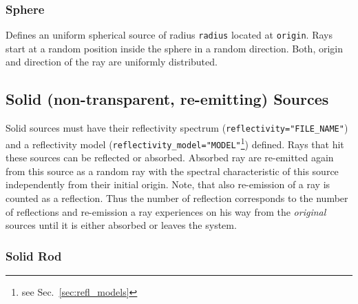 \documentclass[10pt,a4paper,titlepage]{article}
\begin{document}
\subsubsection{Sphere}







\vspace{0.25cm}

Defines an uniform spherical source of radius {\tt radius} located at {\tt origin}. Rays start at a random position inside the sphere in a random direction. Both, origin and direction of the ray are uniformly distributed.

\subsection{Solid (non-transparent, re-emitting) Sources}

Solid sources must have their reflectivity spectrum ({\tt reflectivity="FILE\_NAME"}) and a reflectivity model ({\tt reflectivity\_model="MODEL"}\footnote{see Sec.~\ref{sec:refl_models}}) defined. Rays that hit these sources can be reflected or absorbed. Absorbed ray are re-emitted again from this source as a random ray with the spectral characteristic of this source independently from their initial origin. Note, that also re-emission of a ray is counted as a reflection. Thus the number of reflection corresponds to the number of reflections and re-emission a ray experiences on his way from the \emph{original} sources until it is either absorbed or leaves the system.

\subsubsection{Solid Rod}





\end{document}
